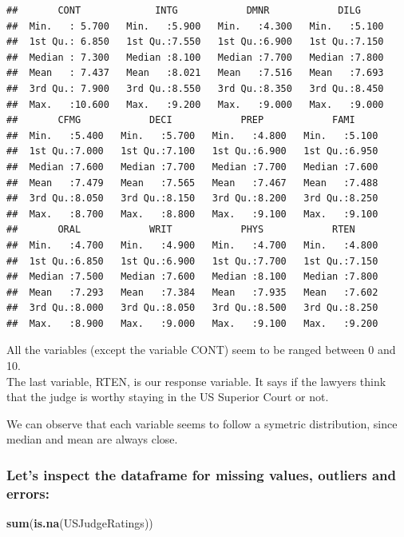 \documentclass[]{article}
\newenvironment{Shaded}{\begin{snugshade}}{\end{snugshade}}
\newcommand{\KeywordTok}[1]{\textcolor[rgb]{0.13,0.29,0.53}{\textbf{#1}}}
\newcommand{\NormalTok}[1]{#1}
\begin{document}
\begin{verbatim}
##       CONT             INTG            DMNR            DILG      
##  Min.   : 5.700   Min.   :5.900   Min.   :4.300   Min.   :5.100  
##  1st Qu.: 6.850   1st Qu.:7.550   1st Qu.:6.900   1st Qu.:7.150  
##  Median : 7.300   Median :8.100   Median :7.700   Median :7.800  
##  Mean   : 7.437   Mean   :8.021   Mean   :7.516   Mean   :7.693  
##  3rd Qu.: 7.900   3rd Qu.:8.550   3rd Qu.:8.350   3rd Qu.:8.450  
##  Max.   :10.600   Max.   :9.200   Max.   :9.000   Max.   :9.000  
##       CFMG            DECI            PREP            FAMI      
##  Min.   :5.400   Min.   :5.700   Min.   :4.800   Min.   :5.100  
##  1st Qu.:7.000   1st Qu.:7.100   1st Qu.:6.900   1st Qu.:6.950  
##  Median :7.600   Median :7.700   Median :7.700   Median :7.600  
##  Mean   :7.479   Mean   :7.565   Mean   :7.467   Mean   :7.488  
##  3rd Qu.:8.050   3rd Qu.:8.150   3rd Qu.:8.200   3rd Qu.:8.250  
##  Max.   :8.700   Max.   :8.800   Max.   :9.100   Max.   :9.100  
##       ORAL            WRIT            PHYS            RTEN      
##  Min.   :4.700   Min.   :4.900   Min.   :4.700   Min.   :4.800  
##  1st Qu.:6.850   1st Qu.:6.900   1st Qu.:7.700   1st Qu.:7.150  
##  Median :7.500   Median :7.600   Median :8.100   Median :7.800  
##  Mean   :7.293   Mean   :7.384   Mean   :7.935   Mean   :7.602  
##  3rd Qu.:8.000   3rd Qu.:8.050   3rd Qu.:8.500   3rd Qu.:8.250  
##  Max.   :8.900   Max.   :9.000   Max.   :9.100   Max.   :9.200
\end{verbatim}

All the variables (except the variable CONT) seem to be ranged between 0
and 10.\\
The last variable, RTEN, is our response variable. It says if the
lawyers think that the judge is worthy staying in the US Superior Court
or not.

We can observe that each variable seems to follow a symetric
distribution, since median and mean are always close.

\hypertarget{lets-inspect-the-dataframe-for-missing-values-outliers-and-errors}{%
\subsubsection{Let's inspect the dataframe for missing values, outliers
and
errors:}\label{lets-inspect-the-dataframe-for-missing-values-outliers-and-errors}}

\begin{Shaded}
\begin{Highlighting}[]
\KeywordTok{sum}\NormalTok{(}\KeywordTok{is.na}\NormalTok{(USJudgeRatings))}
\end{Highlighting}
\end{Shaded}
\end{document}
